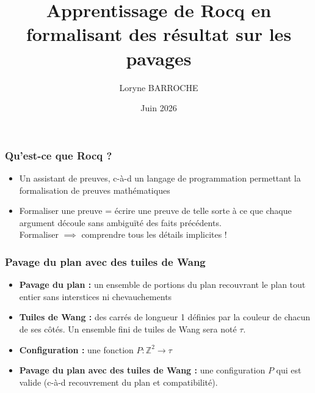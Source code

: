 \documentclass{beamer}
\title[Du Rocq et des pavages]{Apprentissage de Rocq en formalisant des résultat sur les pavages}
\author[L. BARROCHE]{Loryne BARROCHE}
\institute[L2 MPCI]{Co-encadrée par Etienne Miquey et Félix Castro}
\date{Juin 2026}
\newcommand{\Z}{\mathbb{Z}}
\begin{document}
\begin{frame}
\titlepage

\end{frame}

\begin{frame}
\frametitle{Qu'est-ce que Rocq ?}

\begin{itemize}
    \item Un assistant de preuves, c-à-d un langage de programmation permettant la formalisation de preuves mathématiques \\
    \item Formaliser une preuve = écrire une preuve de telle sorte à ce que chaque argument découle sans ambiguïté des faits précédents. \\
    Formaliser $\implies$ comprendre tous les détails implicites !
\end{itemize}

\end{frame}


\begin{frame}
\frametitle{Pavage du plan avec des tuiles de Wang}

\begin{itemize}
    \item \textbf{Pavage du plan :}  un ensemble de portions du plan recouvrant le plan tout entier sans interstices ni chevauchements\\
    \item \textbf{Tuiles de Wang :}  des carrés de longueur 1 définies par la couleur de chacun de ses côtés. Un ensemble fini de tuiles de Wang sera noté $\tau$.\\
    \item \textbf{Configuration :}  une fonction $P : \Z^2 \to \tau$ \\
    \item \textbf{Pavage du plan avec des tuiles de Wang :}   une configuration $P$ qui est \guillemotleft valide \guillemotright (c-à-d recouvrement du plan et compatibilité).
\end{itemize}
\end{frame}
\end{document}
